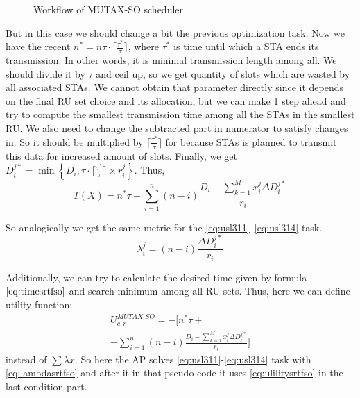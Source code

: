 \begin{figure}[tb]
\begin{scaletikzpicturetowidth}{\columnwidth}
	\end{scaletikzpicturetowidth}
	\caption{\label{fig:mutexso} Workflow of MUTAX-SO scheduler}		
\end{figure}

But in this case we should change a bit the previous optimization task. Now we have the recent $n^* = n\tau\cdot\lceil\frac{\tau^*}{\tau}\rceil$, where $\tau^*$ is time until which a STA ends its transmission. In other words, it is minimal transmission length among all. We should divide it by $\tau$ and ceil up, so we get quantity of slots which are wasted by all associated STAs. We cannot obtain that parameter directly since it depends on the final RU set choice and its allocation, but we can make 1 step ahead and try to compute the smallest transmission time among all the STAs in the smallest RU. We also need to change the subtracted part in numerator to satisfy changes in. So it should be multiplied by $\lceil\frac{\tau^*}{\tau}\rceil$ for because STAs is planned to transmit this data for increased amount of slots. Finally, we get $D_i^{j*} = \min\left\{D_i, \tau\cdot\lceil\frac{\tau^*}{\tau}\rceil \times r_{i}^{j}\right\}$. Thus,  
\begin{equation}
\label{eq:timesrtfso}
T\left(X\right) = n^* \tau + \sum_{i = 1}^{n} \left(n - i\right) \frac{D_i -  \sum_{k = 1}^{M} x_i^j \Delta D_i^{j*}}{r_{i}}
\end{equation}

So analogically we get the same metric for the \eqref{eq:usl311}--\eqref{eq:usl314} task.
\begin{equation}
\label{eq:lambdasrtfso}
\lambda_i^j = \left(n - i\right) \frac{\Delta D_i^{j*}}{r_{i}}
\end{equation}

Additionally, we can try to calculate the desired time given by formula $\eqref{eq:timesrtfso}$ and search minimum among all RU sets. Thus, here we can define utility function:
\begin{multline}
\label{eq:ulilitysrtfso}
U_{c,r}^{MUTAX\text{-}SO} = -\Biggl[ n^* \tau +\\
+ \sum_{i = 1}^{n} \left(n - i\right) \frac{D_i -  \sum_{k = 1}^{M} x_i^j \Delta D_i^{j*}}{r_{i}}\Biggr]
\end{multline}
instead of $\sum \lambda x$. So here the AP solves \eqref{eq:usl311}-\eqref{eq:usl314} task with \eqref{eq:lambdasrtfso} and after it in that pseudo code it uses \eqref{eq:ulilitysrtfso} in the last condition part.

